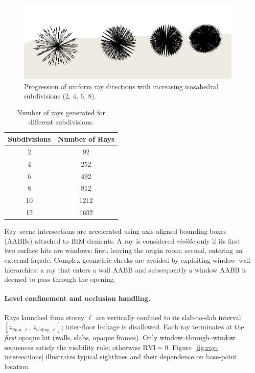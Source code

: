 \documentclass[final,3p,times,review]{elsarticle}
\begin{document}
\begin{figure}[H]
    \centering
    \includegraphics[width=.6\textwidth]{ray-casting.jpg}
    \caption{Progression of uniform ray directions with increasing icosahedral subdivisions (2, 4, 6, 8).}
    \label{fig:raycasting}
\end{figure}

\begin{table}[H]
    \centering
    \caption{Number of rays generated for different subdivisions.}
    \label{tab:subdivisions}
    \begin{tabular}{cc}
        \toprule
        \textbf{Subdivisions} & \textbf{Number of Rays} \\
        \midrule
        2 & 92 \\
        4 & 252 \\
        6 & 492 \\
        8 & 812 \\
        10 & 1212 \\
        12 & 1692 \\
        \bottomrule
    \end{tabular}
\end{table}

Ray–scene intersections are accelerated using axis-aligned bounding boxes (AABBs) attached to BIM elements. A ray is considered \emph{visible} only if its first two surface hits are windows: first, leaving the origin room; second, entering an external façade. Complex geometric checks are avoided by exploiting window–wall hierarchies: a ray that enters a wall AABB and subsequently a window AABB is deemed to pass through the opening.

\paragraph{Level confinement and occlusion handling.}
Rays launched from storey $\ell$ are vertically confined to its slab-to-slab interval $[z_{\mathrm{floor},\ell},\,z_{\mathrm{ceiling},\ell}]$; inter-floor leakage is disallowed. Each ray terminates at the \emph{first} opaque hit (walls, slabs, opaque frames). Only window–through–window sequences satisfy the visibility rule; otherwise $\mathrm{RVI}=0$. Figure~\ref{fig:ray-intersections} illustrates typical sightlines and their dependence on base-point location.
\end{document}
